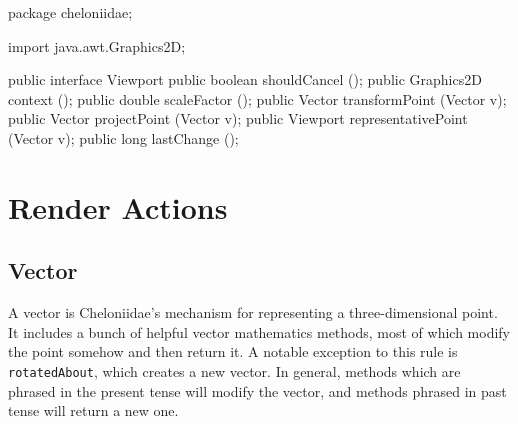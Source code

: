 \documentclass{report}
\begin{document}
\begin{javacode}
package cheloniidae;

import java.awt.Graphics2D;

public interface Viewport {
  public boolean    shouldCancel        ();
  public Graphics2D context             ();
  public double     scaleFactor         ();
  public Vector     transformPoint      (Vector v);
  public Vector     projectPoint        (Vector v);
  public Viewport   representativePoint (Vector v);
  public long       lastChange          ();
}
\end{javacode}

\chapter {Render Actions} \label{sec:render-actions}
\section {Vector} \label{sec:vector}
      A vector is Cheloniidae's mechanism for representing a three-dimensional point. It includes a bunch of helpful vector mathematics methods, most of which
      modify the point somehow and then return it. A notable exception to this rule is {\tt rotatedAbout}, which creates a new vector. In general, methods which
      are phrased in the present tense will modify the vector, and methods phrased in past tense will return a new one.
\end{document}
